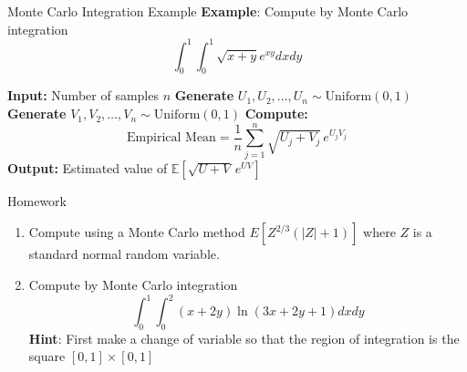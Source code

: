 \documentclass[8pt]{beamer}
\begin{document}
\begin{frame}[fragile]{Monte Carlo Integration Example}
\textbf{Example}: Compute by Monte Carlo integration 
\begin{equation*}
	\int_0^1 \int_0^1 \sqrt{x+y} e^{xy} dxdy
\end{equation*}

\begin{algorithm}[H]
\caption{Monte Carlo Estimator for $\mathbb{E}\!\left[\sqrt{U+V}\, e^{UV}\right]$}
\begin{algorithmic}[1]
  \State \textbf{Input:} Number of samples $n$
  \State \textbf{Generate} $U_1, U_2, \ldots, U_n \sim \text{Uniform}(0,1)$
  \State \textbf{Generate} $V_1, V_2, \ldots, V_n \sim \text{Uniform}(0,1)$
  \State \textbf{Compute:}
  \begin{equation*}
	\text{Empirical Mean} = \frac{1}{n} \sum_{j=1}^{n} \sqrt{U_j + V_j}\, e^{U_j V_j}
  \end{equation*}
  \State \textbf{Output:} Estimated value of $\mathbb{E}\!\left[\sqrt{U+V}\, e^{UV}\right]$
\end{algorithmic}
\end{algorithm}
  

%
\end{frame}

\begin{frame}{Homework}

\begin{enumerate}
	\item Compute using a Monte Carlo method $E\left[Z^{2/3}(|Z|+1)\right]$ where $Z$ is a standard normal random variable.
	\item Compute by Monte Carlo integration 
\begin{equation*}
	\int_0^1 \int_0^2 (x+2y) \ln (3x+2y+1) dx dy
\end{equation*}
\textbf{Hint}: First make a change of variable so that the region of integration is the square $[0,1]\times[0,1]$
\end{enumerate}
\end{frame}
\end{document}
